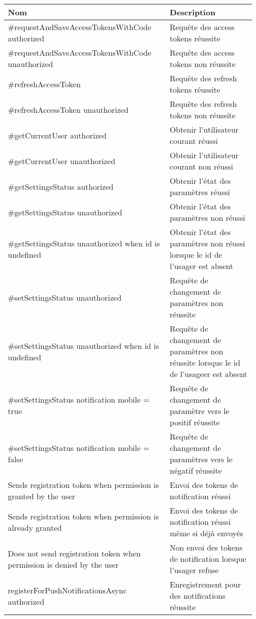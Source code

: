 \begin{tabular}{P{0.45\textwidth}P{0.45\textwidth}}
\hline
\bf Nom
&
\bf Description
\\
\hline
\hline
\#requestAndSaveAccessTokensWithCode authorized
&
Requête des access tokens réussite
\\
\#requestAndSaveAccessTokensWithCode unauthorized
&
Requête des access tokens non réussite
\\
\#refreshAccessToken
&
Requête des refresh tokens réussite
\\
\#refreshAccessToken unauthorized
&
Requête des refresh tokens non réussite
\\
\#getCurrentUser authorized
&
Obtenir l'utilisateur courant réussi
\\
\#getCurrentUser unauthorized
&
Obtenir l'utilisateur courant non réussi
\\
\#getSettingsStatus authorized
&
Obtenir l'état des paramètres réussi
\\
\#getSettingsStatus unauthorized
&
Obtenir l'état des paramètres non réussi
\\
\#getSettingsStatus unauthorized when id is undefined
&
Obtenir l'état des paramètres non réussi lorsque le id de l'usager est absent
\\
\#setSettingsStatus unauthorized
&
Requête de changement de paramètres non réussite
\\
\#setSettingsStatus unauthorized when id is undefined
&
Requête de changement de paramètres non réussite lorsque le id de l'usageer est absent
\\
\#setSettingsStatus notification mobile = true
&
Requête de changement de paramètre vers le positif réussite
\\
\#setSettingsStatus notification mobile = false
&
Requête de changement de paramètres vers le négatif réussite
\\
Sends registration token when permission is granted by the user
&
Envoi des tokens de notification réussi
\\
Sends registration token when permission is already granted
&
Envoi des tokens de notification réussi même si déjà envoyés
\\
Does not send registration token when permission is denied by the user
&
Non envoi des tokens de notification lorsque l'usager refuse
\\
registerForPushNotificationsAsync authorized
&
Enregistrement pour des notifications réussite        
\\
\hline
\end{tabular}
